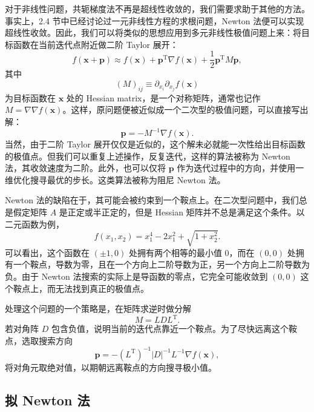 对于非线性问题，共轭梯度法不再是超线性收敛的，我们需要求助于其他的方法。事实上，2.4 节中已经讨论过一元非线性方程的求根问题，Newton 法便可以实现超线性收敛。因此，我们可以将类似的思想应用到多元非线性极值问题上来：将目标函数在当前迭代点附近做二阶 Taylor 展开：
\begin{equation}
f(\bm x+\bm p)\approx f(\bm x)+\bm p^{\mathrm T}\nabla f(\bm x)+\frac12\bm p^{\mathrm T}M\bm p,
\tag{4.1.10}
\end{equation}
其中
\begin{equation}
(M)_{ij}\equiv \partial_{x_i}\partial_{x_j}f(\bm x)
\tag{4.1.11}
\end{equation}
为目标函数在 $\bm x$ 处的 Hessian matrix，是一个对称矩阵，通常也记作 $M=\nabla\nabla f(\bm x)$。这样，原问题便被近似成一个二次型的极值问题，可以直接写出解：
\begin{equation}
\bm p=-M^{-1}\nabla f(\bm x).
\tag{4.1.12}
\end{equation}
当然，由于二阶 Taylor 展开仅仅是近似的，这个解未必就能一次性给出目标函数的极值点。但我们可以重复上述操作，反复迭代，这样的算法被称为 Newton 法，其收敛速度为二阶。此外，也可以仅将 $\bm p$ 作为迭代过程中的方向，并使用一维优化搜寻最优的步长。这类算法被称为阻尼 Newton 法。

Newton 法的缺陷在于，其可能会被约束到一个鞍点上。在二次型问题中，我们总是假定矩阵 $A$ 是正定或半正定的，但是 Hessian 矩阵并不总是满足这个条件。以二元函数为例，
\[
f(x_1,x_2)=x_1^4-2x_1^2+\sqrt{1+x_2^2}.
\]
可以看出，这个函数在 $(\pm1,0)$ 处拥有两个相等的最小值 $0$，而在 $(0,0)$ 处拥有一个鞍点，导数为零，且在一个方向上二阶导数为正，另一个方向上二阶导数为负。由于 Newton 法搜索的实际上是导函数的零点，它完全可能收敛到 $(0,0)$ 这个鞍点上，而无法找到真正的极值点。

处理这个问题的一个策略是，在矩阵求逆时做分解
\begin{equation}
M=LDL^{\mathrm T}.
\tag{4.1.13}
\end{equation}
若对角阵 $D$ 包含负值，说明当前的迭代点靠近一个鞍点。为了尽快远离这个鞍点，选取搜索方向
\begin{equation}
\bm p=-(L^{\mathrm T})^{-1}\lvert D\rvert^{-1}L^{-1}\nabla f(\bm x),
\tag{4.1.14}
\end{equation}
将对角元取绝对值，以期朝远离鞍点的方向搜寻极小值。

\subsection{拟 Newton 法}

